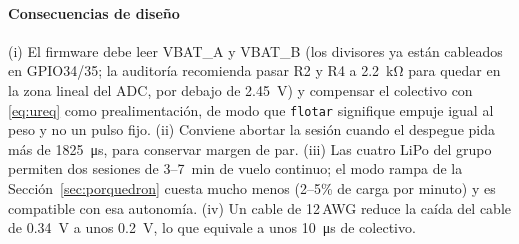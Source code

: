 \paragraph{Consecuencias de diseño}
(i) El firmware debe leer VBAT\_A y VBAT\_B (los divisores ya están cableados en GPIO34/35; la auditoría recomienda pasar R2 y R4 a \SI{2.2}{\kilo\ohm} para quedar en la zona lineal del ADC, por debajo de \SI{2.45}{\volt}) y compensar el colectivo con \eqref{eq:ureq} como prealimentación, de modo que \texttt{flotar} signifique empuje igual al peso y no un pulso fijo. (ii) Conviene abortar la sesión cuando el despegue pida más de \SI{1825}{\micro\second}, para conservar margen de par. (iii) Las cuatro LiPo del grupo permiten dos sesiones de 3--\SI{7}{\minute} de vuelo continuo; el modo rampa de la Sección~\ref{sec:porquedron} cuesta mucho menos (2--5\% de carga por minuto) y es compatible con esa autonomía. (iv) Un cable de 12\,AWG reduce la caída del cable de \SI{0.34}{\volt} a unos \SI{0.2}{\volt}, lo que equivale a unos \SI{10}{\micro\second} de colectivo.
